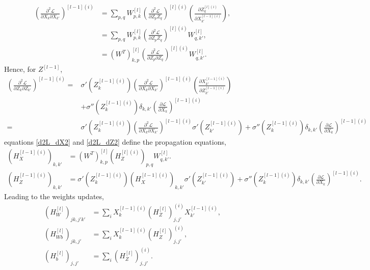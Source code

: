 \documentclass[11pt,twocolumn]{article}
\begin{document}
\begin{align}
\left(\frac{\partial^2 \mathcal{L}}{\partial X_{k}\partial X_{k'}}\right)^{[l-1](i)}
&=\sum_{p,q} W_{p,k}^{[l]}\left(\frac{\partial^2 \mathcal{L}}{\partial Z_{p} Z_{q}}\right)^{[l](i)}\left(\frac{\partial Z_{q}^{[l](i)}}{\partial X_{k'}^{[l-1](i)}}\right),\nonumber\\
&=\sum_{p,q} W_{p,k}^{[l]}\left(\frac{\partial^2 \mathcal{L}}{\partial Z_{p} Z_{q}}\right)^{[l](i)}W_{q,k'}^{[l]},\nonumber\\
&=\left(W^{T}\right)_{k,p}^{[l]}\left(\frac{\partial^2 \mathcal{L}}{\partial Z_{p} \partial Z_{q}}\right)^{[l](i)} W_{q,k'}^{[l]}\label{d2L_dX2}.
\end{align}
Hence, for $Z^{[l-1]}$,
\begin{align}
\left(\frac{\partial^2 \mathcal{L}}{\partial Z_{k} \partial Z_{k'}}\right)^{[l-1](i)}=& \sigma'{(Z_{k}^{[l-1](i)})}\left(\frac{\partial^2 \mathcal{L}}{\partial X_{k}\partial X_{k'}}\right)^{[l-1](i)} \left(\frac{\partial X_{k'}^{[l-1](i)}}{\partial Z_{k'}^{[l-1](i)}}\right)\nonumber\\
&+\sigma''{(Z_{k}^{[l-1](i)})}\delta_{k,k'}\left(\frac{\partial \mathcal{L}}{\partial X_{k}}\right)^{[l-1](i)}\nonumber\\
=&\sigma'{(Z_{k}^{[l-1](i)})}\left(\frac{\partial^2 \mathcal{L}}{\partial X_{k}\partial X_{k'}}\right)^{[l-1](i)} \sigma'{(Z_{k'}^{[l-1](i)})}+\sigma''{(Z_{k}^{[l-1](i)})}\delta_{k,k'}\left(\frac{\partial \mathcal{L}}{\partial X_{k}}\right)^{[l-1](i)}\label{d2L_dZ2}
\end{align}
equations \ref{d2L_dX2} and \ref{d2L_dZ2} define the propagation equations,
\begin{align}
(H_X^{[l-1](i)})_{k,k'}&=\left(W^{T}\right)_{k,p}^{[l]} (H_Z^{[l](i)})_{p,q}W_{q,k'}^{[l]}.\label{backprop_HX}\\
(H_Z^{[l-1](i)})_{k,k'}&=\sigma'{(Z_{k}^{[l-1](i)})}(H_X^{[l-1](i)})_{k,k'} \sigma'{(Z_{k'}^{[l-1](i)})}+\sigma''{(Z_{k}^{[l-1](i)})}\delta_{k,k'}\left(\frac{\partial \mathcal{L}}{\partial X_{k}}\right)^{[l-1](i)}\label{backprop_HZ}.
\end{align}
Leading to the weights updates,
\begin{align}
(H_W^{[l]})_{jk,j'k'}&=\sum_{i}X_{k}^{[l-1](i)}(H_Z^{[l]})^{(i)}_{j,j'}X_{k'}^{[l-1](i)},\\
(H_{Wb}^{[l]})_{jk,j'}&=\sum_{i}X_{k}^{[l-1](i)}(H_Z^{[l]})^{(i)}_{j,j'},\\
(H_b^{[l]})_{j,j'}&=\sum_{i}(H_Z^{[l]})^{(i)}_{j,j'}.\label{H_b_final}
\end{align}
\end{document}

